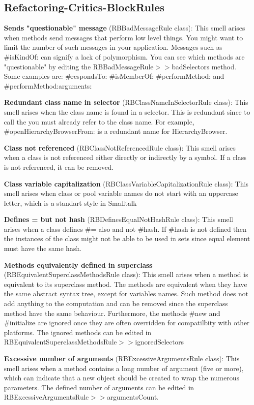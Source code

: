 \subsection{Refactoring-Critics-BlockRules}
\textbf{Sends "questionable" message} (RBBadMessageRule class): This smell arises when methods send messages that perform low level things. You might want to limit the number of such messages in your application. Messages such as \#isKindOf: can signify a lack of polymorphism. You can see which methods are "questionable" by editing the RBBadMessageRule$>>$badSelectors method. Some examples are: \#respondsTo: \#isMemberOf: \#performMethod: and \#performMethod:arguments:

\textbf{Redundant class name in selector} (RBClassNameInSelectorRule class): This smell arises when the class name is found in a selector. This is redundant since to call the you must already refer to the class name. For example, \#openHierarchyBrowserFrom: is a redundant name for HierarchyBrowser.

\textbf{Class not referenced} (RBClassNotReferencedRule class): This smell arises when a class is not referenced either directly or indirectly by a symbol. If a class is not referenced, it can be removed.

\textbf{Class variable capitalization} (RBClassVariableCapitalizationRule class): This smell arises when class or pool variable names do not start with an uppercase letter, which is a standart style in Smalltalk

\textbf{Defines = but not hash} (RBDefinesEqualNotHashRule class): This smell arises when a class defines \#= also and not \#hash. If \#hash is not defined then the instances of the class might not be able to be used in sets since equal element must have the same hash.

\textbf{Methods equivalently defined in superclass} (RBEquivalentSuperclassMethodsRule class): This smell arises when a method is equivalent to its superclass method. The methods are equivalent when they have the same abstract syntax tree, except for variables names. Such method does not add anything to the computation and can be removed since the superclass method have the same behaviour. Furthermore, the methods \#new and \#initialize are ignored once they are often overridden for compatilbity with other platforms. The ignored methods can be edited in RBEquivalentSuperclassMethodsRule$>>$ignoredSelectors

\textbf{Excessive number of arguments} (RBExcessiveArgumentsRule class): This smell arises when a method contains a long number of argument (five or more), which can indicate that a new object should be created to wrap the numerous parameters. The defined number of arguments can be edited in RBExcessiveArgumentsRule$>>$argumentsCount.

